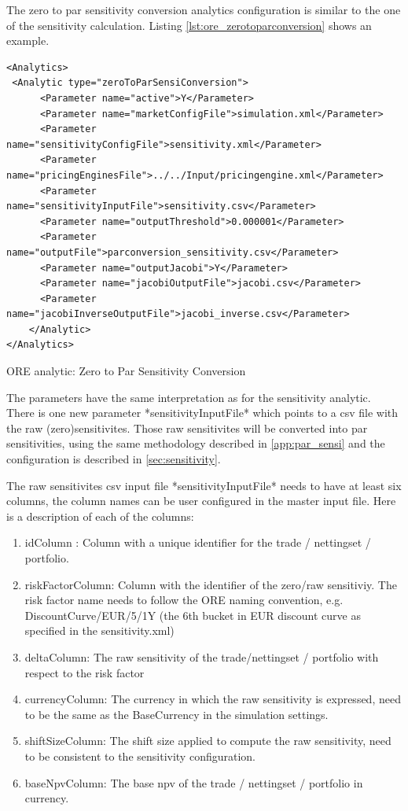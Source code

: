 \documentclass[12pt, a4paper]{article}
\begin{document}
The zero to par sensitivity conversion analytics configuration is similar to the one of the sensitivity calculation. Listing \ref{lst:ore_zerotoparconversion}
shows an example.

\begin{listing}[H]
\begin{verbatim}
<Analytics>
 <Analytic type="zeroToParSensiConversion">
      <Parameter name="active">Y</Parameter>
      <Parameter name="marketConfigFile">simulation.xml</Parameter>
      <Parameter name="sensitivityConfigFile">sensitivity.xml</Parameter>
      <Parameter name="pricingEnginesFile">../../Input/pricingengine.xml</Parameter>
      <Parameter name="sensitivityInputFile">sensitivity.csv</Parameter>
      <Parameter name="outputThreshold">0.000001</Parameter>
      <Parameter name="outputFile">parconversion_sensitivity.csv</Parameter>
      <Parameter name="outputJacobi">Y</Parameter>
      <Parameter name="jacobiOutputFile">jacobi.csv</Parameter>
      <Parameter name="jacobiInverseOutputFile">jacobi_inverse.csv</Parameter>
    </Analytic>
</Analytics>
\end{verbatim}
\caption{ORE analytic: Zero to Par Sensitivity Conversion}
\label{lst:ore_zerotoparconversion}
\end{listing}

The parameters have the same interpretation as for the sensitivity analytic. There is one new parameter *sensitivityInputFile* which points to a csv file with the raw (zero)sensitivites. Those raw sensitivites will be converted into par sensitivities, using the same methodology described in \ref{app:par_sensi} and the configuration is described in \ref{sec:sensitivity}.

The raw sensitivites csv input file *sensitivityInputFile* needs to have at least six columns, the column names can be user configured in the master input file. Here is a description of each of the columns:

\begin{enumerate}
\item idColumn : Column with a unique identifier for the trade / nettingset / portfolio.
\item riskFactorColumn: Column with the identifier of the zero/raw sensitiviy. The risk factor name needs to follow the ORE naming convention, e.g. DiscountCurve/EUR/5/1Y (the 6th bucket in EUR discount curve as specified in the sensitivity.xml)\
\item deltaColumn: The raw sensitivity of the trade/nettingset / portfolio with respect to the risk factor
\item currencyColumn: The currency in which the raw sensitivity is expressed, need to be the same as the BaseCurrency in the simulation settings.
\item shiftSizeColumn: The shift size applied to compute the raw sensitivity, need to be consistent to the sensitivity configuration.
\item baseNpvColumn: The base npv of the trade / nettingset / portfolio in currency.
\end{enumerate}
\end{document}
